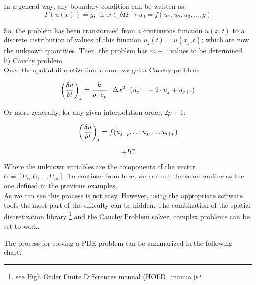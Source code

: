 In a general way, any boundary condition can be written as: 
$$
F(u(x))=g;\;\; \text{if} \:\: x \in \delta\Omega \rightarrow u_0=f(u_1,u_2,
u_3,\ldots, g) $$

So, the problem has been transformed from a continuous function $u(x,t)$ to a
discrete distribution of values of this function $u_j(t)=u(x_j,t)$; which are
now the unknown quantities. Then, the problem has $m+1$ values to be
determined.\\

b) Cauchy problem \\

Once the spatial discretization is done we get a Cauchy problem: 

$$
\left(\frac{\delta u}{\delta t}\right)_j= \frac{k}{\rho \cdot c_p }\cdot {\Delta x^2} \cdot ( u_{j-1}
-2 \cdot u_{j} +u_{j+1})\\
$$

Or more generally, for any given interpolation order, $2p+1$: 

$$
\left(\frac{\delta u}{\delta t}\right)_j= f(u_{j-p},\ldots u_j, \ldots
u_{j+p})\\
$$

$$
+IC
$$

Where the unknown variables are the components of the vector $U=[U_0, U_1\ldots
, U_m]$. To continue from here, we can use the same routine as the one defined in the previous examples. \\


As we can see this process is not easy. However, using the appropriate software
tools the most part of the diffculty can be hidden. The combination of the
spatial discretization library \footnote{see High Order Finite Differences
manual (HOFD\_manual)} and the Cauchy Problem solver, complex problems can be
set to work.\\

\newpage

The process for solving a PDE problem can be summarized in the
following chart: \\


